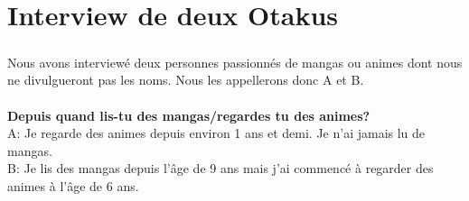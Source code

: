 \chapter{Interview de deux Otakus}

\paragraph{} Nous avons interviewé deux personnes passionnés de mangas ou animes
dont nous ne divulgueront pas les noms. Nous les appellerons donc A et B.\\
\\

\textbf{Depuis quand lis-tu des mangas/regardes tu des animes?}\\
A: Je regarde des animes depuis environ 1 ans et demi. Je n'ai jamais lu de
mangas.\\
B: Je lis des mangas depuis l'âge de 9 ans mais j'ai commencé à regarder des
animes à l'âge de 6 ans.\\

